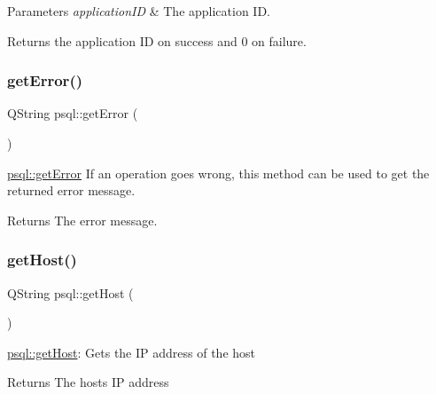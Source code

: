 \begin{DoxyParams}{Parameters}
{\em application\+ID} & The application ID. \\
\hline
\end{DoxyParams}
\begin{DoxyReturn}{Returns}
the application ID on success and 0 on failure. 
\end{DoxyReturn}
\mbox{\label{classpsql_a5f51e254b67ff932f287df2184ccc043}} 
\subsubsection{\texorpdfstring{get\+Error()}{getError()}}
{\footnotesize\ttfamily Q\+String psql\+::get\+Error (\begin{DoxyParamCaption}{ }\end{DoxyParamCaption})}



\hyperlink{classpsql_a5f51e254b67ff932f287df2184ccc043}{psql\+::get\+Error} If an operation goes wrong, this method can be used to get the returned error message. 

\begin{DoxyReturn}{Returns}
The error message. 
\end{DoxyReturn}
\mbox{\label{classpsql_a95d06ee661db0b9cf72605b983b04613}} 
\subsubsection{\texorpdfstring{get\+Host()}{getHost()}}
{\footnotesize\ttfamily Q\+String psql\+::get\+Host (\begin{DoxyParamCaption}{ }\end{DoxyParamCaption})}



\hyperlink{classpsql_a95d06ee661db0b9cf72605b983b04613}{psql\+::get\+Host}\+: Gets the IP address of the host 

\begin{DoxyReturn}{Returns}
The host\textquotesingle{}s IP address 
\end{DoxyReturn}
\mbox{\label{classpsql_aca1b2273937491e113089c1547caf49b}} 
